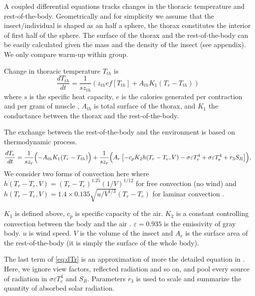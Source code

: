 A coupled differential equations  tracks changes in the thoracic temperature and rest-of-the-body.%
Geometrically and for simplicity we  assume that the insect/individual is shaped as an half a sphere, the thorax constitutes the interior of first half of the sphere.
The surface of the thorax and the rest-of-the-body can be easily calculated given the mass and the density of the insect (see appendix).
We only compare warm-up within group.

Change in thoracic temperature $T_{th}$ is 
\begin{equation} \label{eq:dTh}
	\frac{dT_{th}}{dt} = \frac{1}{s z_{th}} (z_{th} e f[T_{th}] +  A_{th} K_1(T_r - T_{th}))
\end{equation}
where $s$ is the specific heat capacity, $e$ is the calories generated per contraction and per gram of muscle \citep{Kammer1974}, $A_{th}$ is total surface of the thorax, and $K_1$ the conductance between the thorax and the rest-of-the-body.

The exchange between the rest-of-the-body and the environment is based on thermodynamic process. 
\begin{equation} \label{eq:dTr} 
		\frac{dT_{r}}{dt} =  \frac{1}{s z_{r}} \Bigl( - A_{th} K_1(T_r - T_{th})  \Bigr)
			+ \frac{1}{s z_{r}} \Bigl( A_r \left[ - c_p K_2 h(T_r -T_e, V)- \sigma \varepsilon T_r^4 + \sigma \varepsilon T_e^4  + r_3 S_R  \right] \Bigr),
\end{equation}
We consider two forms of convection here where $ h(T_r -T_e, V) = (T_r- T_e)^{1.25} (1/V)^{1/12 }$ for free convection (no wind) and $ h(T_r -T_e, V) =  1.4 \times 0.135 \sqrt{u/V^{1/3}} (T_r- T_e) $ for laminar convection \citep{Campbell2012}.

$K_1$ is defined above, $c_p$ is specific capacity of the air. 
$K_2$ is a constant controlling convection between the body and the air \citep{Campbell2012}.
$\varepsilon = 0.935$  is the emissivity of gray body.
$u$ is wind speed.
$V$ is the volume of the insect and $A_r$ is the surface area of the rest-of-the-body (it is simply the surface of the whole body).

The last term of \cref{eq:dTr}  is an approximation of more the detailed equation in \citet{Campbell2012}.
Here, we ignore view factors, reflected radiation and so on, and pool every source of radiation in $ \sigma \varepsilon T_e^4$ and $S_R$. 
Parameters $r_3$ is used to scale and summarize the quantity of absorbed solar radiation.

